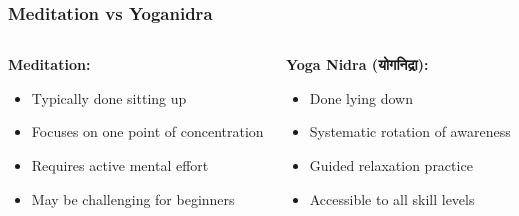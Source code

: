 
\begin{frame}[fragile]\frametitle{Meditation vs Yoganidra}
    \begin{columns}
        \begin{column}{0.48\textwidth}
            \textbf{Meditation:}
            \begin{itemize}
                \item Typically done sitting up
                \item Focuses on one point of concentration
                \item Requires active mental effort
                \item May be challenging for beginners
            \end{itemize}
        \end{column}
        \begin{column}{0.48\textwidth}
            \textbf{Yoga Nidra (योगनिद्रा):}
            \begin{itemize}
                \item Done lying down
                \item Systematic rotation of awareness
                \item Guided relaxation practice
                \item Accessible to all skill levels
            \end{itemize}
        \end{column}
    \end{columns}
\end{frame}

